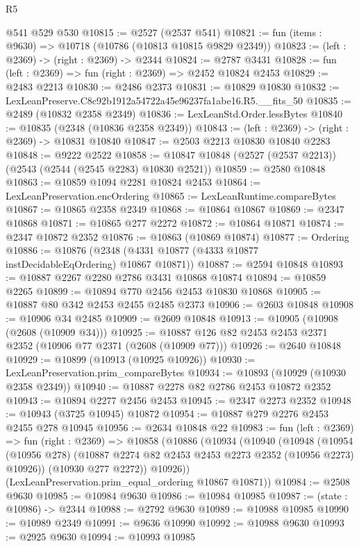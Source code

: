 \begin{lexlean}{R5}
\begin{coremodule}
    @541
    @529
    @530
@10815 := @2527 (@2537 @541)
@10821 := fun (items : @9630) => @10718 (@10786 (@10813 @10815 @9829 @2349))
@10823 := (left : @2369) -> (right : @2369) -> @2344
@10824 := @2787 @3431
@10828 := fun (left : @2369) => fun (right : @2369) => @2452 @10824 @2453
@10829 := @2483 @2213
@10830 := @2486 @2373
@10831 := @10829 @10830
@10832 := LexLeanPreserve.C8c92b1912a54722a45e96237fa1abe16.R5.__fits_50
@10835 := @2489 (@10832 @2358 @2349)
@10836 := LexLeanStd.Order.lessBytes
@10840 := @10835 (@2348 (@10836 @2358 @2349))
@10843 := (left : @2369) -> (right : @2369) -> @10831 @10840
@10847 := @2503 @2213 @10830 @10840 @2283
@10848 := @9222 @2522
@10858 := @10847 @10848 (@2527 (@2537 @2213)) (@2543 (@2544 (@2545 @2283) @10830 @2521))
@10859 := @2580 @10848
@10863 := @10859 @1094 @2281 @10824 @2453
@10864 := LexLeanPreservation.encOrdering
@10865 := LexLeanRuntime.compareBytes
@10867 := @10865 @2358 @2349
@10868 := @10864 @10867
@10869 := @2347 @10868
@10871 := @10865 @277 @2272
@10872 := @10864 @10871
@10874 := @2347 @10872 @2352
@10876 := @10863 (@10869 @10874)
@10877 := Ordering
@10886 := @10876 (@2348 (@4331 @10877 (@4333 @10877 instDecidableEqOrdering) @10867 @10871))
@10887 := @2594 @10848
@10893 := @10887 @2267 @2280 @2786 @3431 @10868 @10874
@10894 := @10859 @2265
@10899 := @10894 @770 @2456 @2453 @10830 @10868
@10905 := @10887 @80 @342 @2453 @2455 @2485 @2373
@10906 := @2603 @10848
@10908 := @10906 @34 @2485
@10909 := @2609 @10848
@10913 := @10905 (@10908 (@2608 (@10909 @34)))
@10925 := @10887 @126 @82 @2453 @2453 @2371 @2352 (@10906 @77 @2371 (@2608 (@10909 @77)))
@10926 := @2640 @10848
@10929 := @10899 (@10913 (@10925 @10926))
@10930 := LexLeanPreservation.prim_compareBytes
@10934 := @10893 (@10929 (@10930 @2358 @2349))
@10940 := @10887 @2278 @82 @2786 @2453 @10872 @2352
@10943 := @10894 @2277 @2456 @2453
@10945 := @2347 @2273 @2352
@10948 := @10943 (@3725 @10945) @10872
@10954 := @10887 @279 @2276 @2453 @2455 @278 @10945
@10956 := @2634 @10848 @22
@10983 := fun (left : @2369) =>
  fun (right : @2369) =>
  @10858
    (@10886
      (@10934
        (@10940
          (@10948
            (@10954 (@10956 @278) (@10887 @2274 @82 @2453 @2453 @2273 @2352 (@10956 @2273) @10926))
            (@10930 @277 @2272))
          @10926))
      (LexLeanPreservation.prim_equal_ordering @10867 @10871))
@10984 := @2508 @9630
@10985 := @10984 @9630
@10986 := @10984 @10985
@10987 := (state : @10986) -> @2344
@10988 := @2792 @9630
@10989 := @10988 @10985
@10990 := @10989 @2349
@10991 := @9636 @10990
@10992 := @10988 @9630
@10993 := @2925 @9630
@10994 := @10993 @10985

\end{coremodule}
\end{lexlean}
